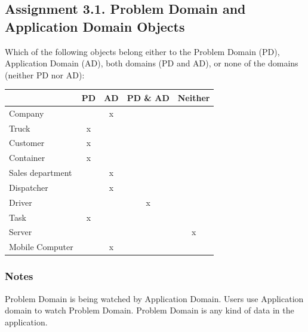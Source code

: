 \subsection{Assignment 3.1. Problem Domain and Application Domain Objects}
Which of the following objects belong either to the Problem Domain (PD), Application Domain (AD), both domains (PD and AD), or none of the domains (neither PD nor AD): 
\begin{center}
    \begin{tabular}{|l|c|c|c|c|}
    \hline
         & PD & AD & PD \& AD & Neither  \\ \hline
        Company             & & x & & \\ \hline
        Truck               & x & & & \\ \hline
        Customer            & x & & & \\ \hline
        Container           & x & & & \\ \hline
        Sales department    & & x & & \\ \hline
        Dispatcher          & & x & & \\ \hline
        Driver              & & & x & \\ \hline
        Task                & x & & & \\ \hline
        Server              & & & & x \\ \hline
        Mobile Computer     & & x & & \\ \hline
    \end{tabular}
\end{center}
\subsubsection*{Notes}
Problem Domain is being watched by Application Domain. Users use Application domain to watch Problem Domain. Problem Domain is any kind of data in the application.
